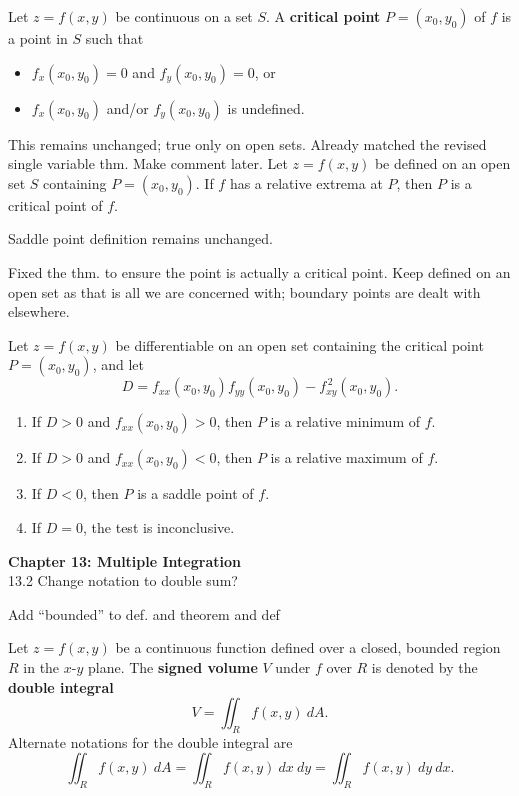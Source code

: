 \documentclass{article}
\begin{document}
{Let $z = f(x,y)$ be continuous on a set $S$. A \textbf{critical point} $P=(x_0,y_0)$ of $f$ is a point in $S$ such that 
\begin{itemize}
	\item $f_x(x_0,y_0) = 0$ and $f_y(x_0,y_0) = 0$, or
	\item	$f_x(x_0,y_0)$ and/or $f_y(x_0,y_0)$ is undefined.
\end{itemize}
}
This remains unchanged; true only on open sets. Already matched the revised single variable thm. Make comment later.
{Let $z=f(x,y)$ be defined on an open set $S$ containing $P=(x_0,y_0)$. If $f$ has a relative extrema at $P$, then $P$ is a critical point of $f$.
}

Saddle point definition remains unchanged.

Fixed the thm. to ensure the point is actually a critical point. Keep defined on an open set as that is all we are concerned with; boundary points are dealt with elsewhere.
{Let $z=f(x,y)$ be differentiable on an open set containing the critical point $P = (x_0,y_0)$, and let 
$$D = f_{xx}(x_0,y_0)f_{yy}(x_0,y_0)-f_{xy}^{\,2}(x_0,y_0).$$
\begin{enumerate}
	\item If $D>0$ and $f_{xx}(x_0,y_0)>0$, then $P$ is a relative minimum of $f$.
	\item If $D>0$ and $f_{xx}(x_0,y_0)<0$, then $P$ is a relative maximum of $f$.
	\item	If $D<0$, then $P$ is a saddle point of $f$.
	\item If $D=0$, the test is inconclusive.
\end{enumerate}
}

\noindent\large\textbf{Chapter 13: Multiple Integration}\normalsize\\

13.2 Change notation to double sum?

Add ``bounded'' to def. and theorem and def

{Let $z=f(x,y)$ be a continuous function defined over a closed, bounded region $R$ in the $x$-$y$ plane. The \textbf{signed volume} $V$ under $f$ over $R$ is denoted by the \textbf{double integral}
$$V = \iint_R f(x,y)\ dA.$$
Alternate notations for the double integral are
$$\iint_R f(x,y)\ dA=\iint_R f(x,y)\ dx\ dy=\iint_R f(x,y)\ dy\ dx.$$
}
\end{document}
